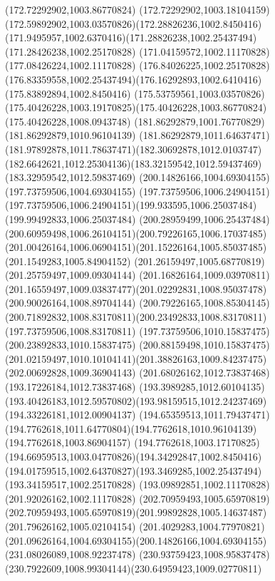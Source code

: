 {{\lineto(172.72292902,1003.86770824)
\curveto(172.72292902,1003.18104159)(172.59892902,1003.03570826)(172.28826236,1002.8450416)
\curveto(171.9495957,1002.6370416)(171.28826238,1002.25437494)(171.28426238,1002.25170828)
\lineto(171.04159572,1002.11170828)
\lineto(177.08426224,1002.11170828)
\lineto(176.84026225,1002.25170828)
\curveto(176.83359558,1002.25437494)(176.16292893,1002.6410416)(175.83892894,1002.8450416)
\curveto(175.53759561,1003.03570826)(175.40426228,1003.19170825)(175.40426228,1003.86770824)
\lineto(175.40426228,1008.0943748)
\lineto(181.86292879,1001.76770829)
\lineto(181.86292879,1010.96104139)
\curveto(181.86292879,1011.64637471)(181.97892878,1011.78637471)(182.30692878,1012.0103747)
\curveto(182.6642621,1012.25304136)(183.32159542,1012.59437469)(183.32959542,1012.59837469)
\closepath
\moveto(200.14826166,1004.69304155)
\lineto(197.73759506,1004.69304155)
\lineto(197.73759506,1006.24904151)
\curveto(197.73759506,1006.24904151)(199.933595,1006.25037484)(199.99492833,1006.25037484)
\curveto(200.28959499,1006.25437484)(200.60959498,1006.26104151)(200.79226165,1006.17037485)
\curveto(201.00426164,1006.06904151)(201.15226164,1005.85037485)(201.1549283,1005.84904152)
\lineto(201.26159497,1005.68770819)
\lineto(201.25759497,1009.09304144)
\lineto(201.16826164,1009.03970811)
\curveto(201.16559497,1009.03837477)(201.02292831,1008.95037478)(200.90026164,1008.89704144)
\curveto(200.79226165,1008.85304145)(200.71892832,1008.83170811)(200.23492833,1008.83170811)
\lineto(197.73759506,1008.83170811)
\lineto(197.73759506,1010.15837475)
\lineto(200.23892833,1010.15837475)
\curveto(200.88159498,1010.15837475)(201.02159497,1010.10104141)(201.38826163,1009.84237475)
\lineto(202.00692828,1009.36904143)
\lineto(201.68026162,1012.73837468)
\lineto(193.17226184,1012.73837468)
\lineto(193.3989285,1012.60104135)
\curveto(193.40426183,1012.59570802)(193.98159515,1012.24237469)(194.33226181,1012.00904137)
\curveto(194.65359513,1011.79437471)(194.7762618,1011.64770804)(194.7762618,1010.96104139)
\lineto(194.7762618,1003.86904157)
\curveto(194.7762618,1003.17170825)(194.66959513,1003.04770826)(194.34292847,1002.8450416)
\curveto(194.01759515,1002.64370827)(193.3469285,1002.25437494)(193.34159517,1002.25170828)
\lineto(193.09892851,1002.11170828)
\lineto(201.92026162,1002.11170828)
\lineto(202.70959493,1005.65970819)
\curveto(202.70959493,1005.65970819)(201.99892828,1005.14637487)(201.79626162,1005.02104154)
\curveto(201.4029283,1004.77970821)(201.09626164,1004.69304155)(200.14826166,1004.69304155)
\moveto(231.08026089,1008.92237478)
\curveto(230.93759423,1008.95837478)(230.7922609,1008.99304144)(230.64959423,1009.02770811)
}}
